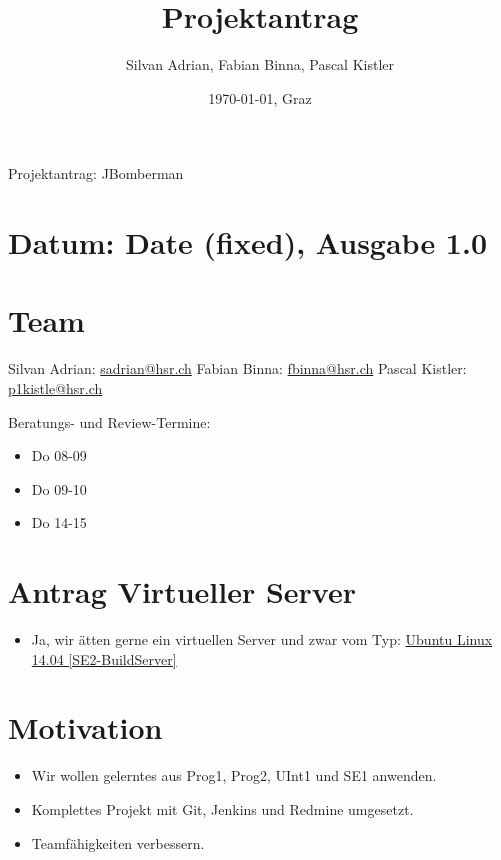 \documentclass[11pt]{scrartcl}
\title{Projektantrag}
\author{Silvan Adrian, Fabian Binna, Pascal Kistler}
\date{\today{}, Graz}
\begin{document}
\begin{center}
{\huge Projektantrag: JBomberman}
\end{center}

\section{Datum: Date (fixed), Ausgabe 1.0}
\label{sec:datum}

\section{Team}
\label{sec:Team}
Silvan Adrian: \href{mailto:sadrian@hsr.ch}{sadrian@hsr.ch}\newline
Fabian Binna: \href{mailto:fbinna@hsr.ch}{fbinna@hsr.ch}\newline
Pascal Kistler: \href{mailto:p1kistle@hsr.ch}{p1kistle@hsr.ch}\newline

Beratungs- und Review-Termine:
\begin{itemize}
    \item Do 08-09
    \item Do 09-10
    \item Do 14-15
\end{itemize}

\section{Antrag Virtueller Server}
\label{sec:antragserver}
\begin{itemize}
    \item Ja, wir ätten gerne ein virtuellen Server und zwar vom Typ:
    \uline {Ubuntu Linux 14.04 [SE2-BuildServer]}
\end{itemize}

\section{Motivation}
\label{sec:motivation}
\begin{itemize}
    \item Wir wollen gelerntes aus Prog1, Prog2, UInt1 und SE1 anwenden.
    \item Komplettes Projekt mit Git, Jenkins und Redmine umgesetzt.
    \item Teamfähigkeiten verbessern.
\end{itemize}
\end{document}

